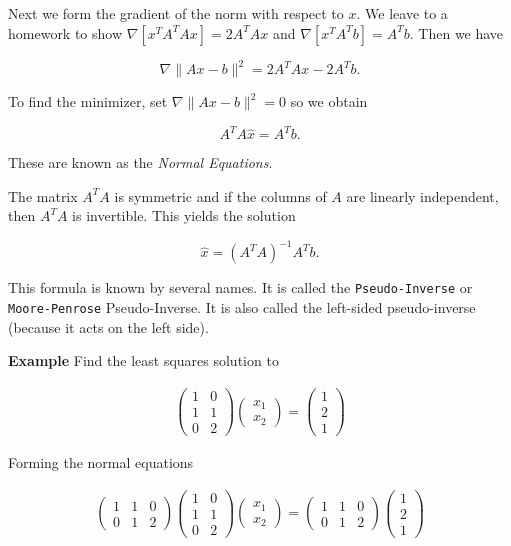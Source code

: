 Next we form the gradient of the norm with respect to \(x\). We leave to
a homework to show \(\nabla [x^TA^T Ax] = 2 A^TAx\) and
\(\nabla [x^TA^Tb] = A^T b\). Then we have

\[\nabla \| Ax - b\|^2 = 2 A^TAx  - 2A^T b  .\]

To find the minimizer, set \(\nabla \| Ax - b\|^2 = 0\) so we obtain

\[A^TA\hat{x}  = A^T b .\]

These are known as the \emph{Normal Equations}.

The matrix \(A^T A\) is symmetric and if the columns of \(A\) are
linearly independent, then \(A^T A\) is invertible. This yields the
solution

\[\hat{x} = \left( A^T A\right)^{-1} A^T b .\]

This formula is known by several names. It is called the
\texttt{Pseudo-Inverse} or \texttt{Moore-Penrose} Pseudo-Inverse. It is
also called the left-sided pseudo-inverse (because it acts on the left
side).

\textbf{Example} Find the least squares solution to

\[\begin{aligned}
\begin{pmatrix} 1 & 0 \\ 1 & 1 \\ 0 & 2 \end{pmatrix}\begin{pmatrix} x_1 \\ x_2 \end{pmatrix} = \begin{pmatrix} 1 \\ 2 \\ 1 \end{pmatrix}
\end{aligned}\]

Forming the normal equations

\[\begin{aligned}
\begin{pmatrix} 1 & 1 & 0 \\ 0 & 1 & 2 \end{pmatrix}
 \begin{pmatrix} 1 & 0 \\ 1 & 1 \\ 0 & 2 \end{pmatrix}\begin{pmatrix} x_1 \\ x_2 \end{pmatrix} = \begin{pmatrix} 1 & 1 & 0 \\ 0 & 1 & 2 \end{pmatrix}
 \begin{pmatrix} 1 \\ 2 \\ 1 \end{pmatrix}
\end{aligned}\]

